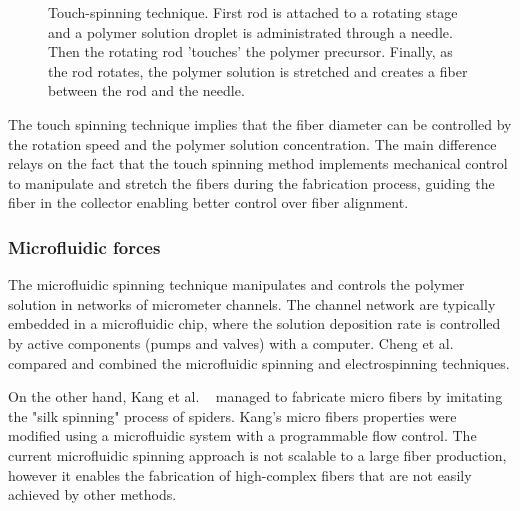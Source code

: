 \documentclass[5p,,preprint,12pt,twocolumn]{elsarticle}
\makeatletter
\def\fixFloatSize#1{}%
\makeatother
\begin{document}
\bgroup
\fixFloatSize{images/c33e7bfe-18c6-4765-834e-a85f12cd2621-uimg_touch_process.png}
\begin{figure}[!htbp]
\centering \makeatletter{}
\makeatother 
\caption{{Touch-spinning technique. First rod is attached to a rotating stage and a polymer solution droplet is administrated through a needle. Then the rotating rod 'touches' the polymer precursor. Finally, as the rod rotates, the polymer solution is stretched and creates a fiber between the rod and the needle.}}
\label{f-f17259e76303}
\end{figure}
\egroup
The touch spinning technique implies that the fiber diameter can be controlled by the rotation speed and the polymer solution concentration. The main difference relays on the fact that the touch spinning method implements mechanical control to manipulate and stretch the fibers during the fabrication process, guiding the fiber in the collector enabling better control over fiber alignment.\unskip~\cite{527120:14091959}



\subsubsection{Microfluidic forces}The microfluidic spinning technique manipulates and controls the polymer solution in networks of micrometer channels. The channel network are typically embedded in a microfluidic chip, where the solution deposition rate is controlled by active components (pumps and valves) with a computer. Cheng et al. \unskip~\cite{527120:13656236} compared and combined the microfluidic spinning and electrospinning techniques. 

On the other hand, Kang et al. \unskip~\cite{527120:13656548} managed to fabricate micro fibers by imitating the "silk spinning" process of spiders. Kang's micro fibers properties were modified using a microfluidic system with a programmable flow control. The current microfluidic spinning approach is not scalable to a large fiber production, however it enables the fabrication of high-complex fibers that are not easily achieved by other methods.
\end{document}
